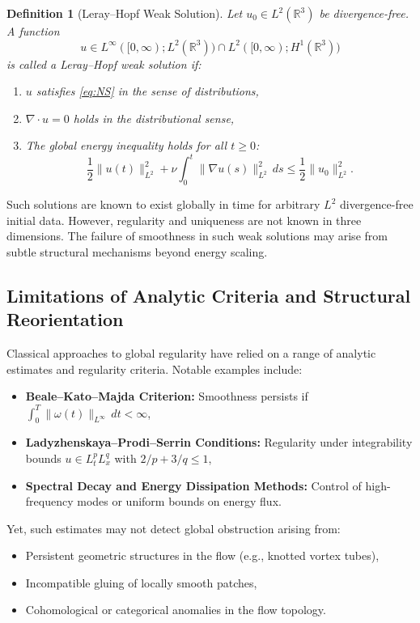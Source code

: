 \documentclass[11pt]{article}
\newtheorem{definition}[theorem]{Definition}
\begin{document}
\begin{definition}[Leray--Hopf Weak Solution]
Let \( u_0 \in L^2(\mathbb{R}^3) \) be divergence-free. A function
\[
u \in L^\infty([0,\infty); L^2(\mathbb{R}^3)) \cap L^2([0,\infty); H^1(\mathbb{R}^3))
\]
is called a \emph{Leray--Hopf weak solution} if:
\begin{enumerate}
  \item \( u \) satisfies \eqref{eq:NS} in the sense of distributions,
  \item \( \nabla \cdot u = 0 \) holds in the distributional sense,
  \item The global energy inequality holds for all \( t \geq 0 \):
  \[
  \frac{1}{2} \| u(t) \|_{L^2}^2 + \nu \int_0^t \| \nabla u(s) \|_{L^2}^2 \, ds
  \leq \frac{1}{2} \| u_0 \|_{L^2}^2.
  \]
\end{enumerate}
\end{definition}

Such solutions are known to exist globally in time for arbitrary \( L^2 \) divergence-free initial data. However, regularity and uniqueness are not known in three dimensions. The failure of smoothness in such weak solutions may arise from subtle structural mechanisms beyond energy scaling.

\subsection{Limitations of Analytic Criteria and Structural Reorientation}

Classical approaches to global regularity have relied on a range of analytic estimates and regularity criteria. Notable examples include:
\begin{itemize}
  \item \textbf{Beale--Kato--Majda Criterion:} Smoothness persists if \( \int_0^T \| \omega(t) \|_{L^\infty} \, dt < \infty \),
  \item \textbf{Ladyzhenskaya--Prodi--Serrin Conditions:} Regularity under integrability bounds \( u \in L^p_t L^q_x \) with \( 2/p + 3/q \leq 1 \),
  \item \textbf{Spectral Decay and Energy Dissipation Methods:} Control of high-frequency modes or uniform bounds on energy flux.
\end{itemize}

Yet, such estimates may not detect global obstruction arising from:
\begin{itemize}
  \item Persistent geometric structures in the flow (e.g., knotted vortex tubes),
  \item Incompatible gluing of locally smooth patches,
  \item Cohomological or categorical anomalies in the flow topology.
\end{itemize}
\end{document}
